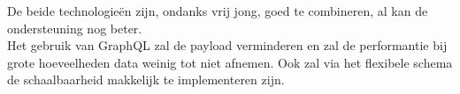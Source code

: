 De beide technologieën zijn, ondanks vrij jong, goed te combineren, al kan de ondersteuning nog beter.\\ 
Het gebruik van GraphQL zal de payload verminderen en zal de performantie bij grote hoeveelheden data weinig tot niet afnemen. Ook zal via het flexibele schema de schaalbaarheid makkelijk te implementeren zijn.



